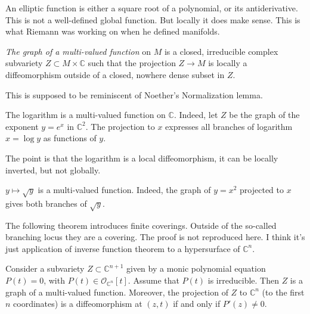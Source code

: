 \medskip\noindent
An elliptic function is either a square root
of a polynomial, or its antiderivative. This
is not a well-defined global function. But
locally it does make sense. This is what
Riemann was working on when he defined
manifolds.

\begin{definition}
\label{definition-multi-valued-function}
{\it 
The graph of 
a multi-valued function} on $M$ is a closed,
irreducible complex subvariety
$Z \subset M \times \mathbb{C}$ such that
the projection $Z \to M$ is locally a
diffeomorphism outside of a closed, nowhere
dense subset in $Z$.
\end{definition}

\noindent
This is supposed to be reminiscent
of Noether's Normalization lemma.

\begin{example}
The logarithm is a multi-valued function on
$\mathbb{C}$. Indeed, let $Z$ be the graph of
the exponent $y=e^x$ in $\mathbb{C}^2$. The
projection to $x$ expresses all branches of
logarithm $x=\log y$ as functions of $y$.

The point is that the logarithm
is a local diffeomorphism, it can be
locally inverted, but not globally.
\end{example}

\begin{example}
$y \mapsto \sqrt{y}$ is a multi-valued
function. Indeed, the graph of $y=x^2$
projected to $x$ gives both branches of
$\sqrt{y}$.
\end{example}

\noindent
The following theorem introduces
finite coverings. Outside of the so-called
branching locus they are a covering.
The proof is not reproduced here.
I think it's just application of inverse
function theorem to a hypersurface
of $\mathbb{C}^n$.

\begin{theorem}
\label{theorem-monic-polynomial-multivalued}
Consider a subvariety $Z \subset
\mathbb{C}^{n+1}$ given by a monic
polynomial equation $P(t)=0$, with
$P(t)\in \mathcal{O}_{\mathbb{C}^n}[t]$.
Assume that $P(t)$ is irreducible. Then $Z$
is a graph of a multi-valued function.
Moreover, the projection of $Z$ to
$\mathbb{C}^n$ (to the first $n$
coordinates) is a diffeomorphism at
$(z,t)$ if and only if $P'(z)\neq 0$.
\end{theorem}

